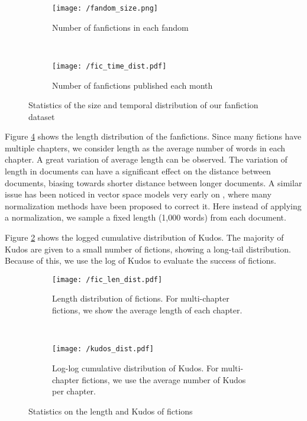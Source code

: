 \documentclass[a4paper]{article}
\begin{document}
\begin{figure}
    \centering
    \begin{subfigure}[b]{0.4\textwidth}
        \texttt{[image: /fandom\_size.png]}
        \caption{Number of fanfictions in each fandom}
        \label{fig:fandom_size}
    \end{subfigure}
    ~ %
    \begin{subfigure}[b]{0.4\textwidth}
        \texttt{[image: /fic\_time\_dist.pdf]}
        \caption{Number of fanfictions published each month}
        \label{fig:fic_time_dist}
    \end{subfigure}
    \caption{Statistics of the size and temporal distribution of our fanfiction dataset}\label{fig:stats_size_time}
\end{figure}

Figure \ref{fig:length_dist} shows the length distribution of the fanfictions. Since many fictions have multiple chapters, we consider length as the average number of words in each chapter. A great variation of average length can be observed. The variation of length in documents can have a significant effect on the distance between documents, biasing towards shorter distance between longer documents. A similar issue has been noticed in vector space models very early on \cite{singhal2017pivoted}, where many normalization methods have been proposed to correct it. Here instead of applying a normalization, we sample a fixed length (1,000 words) from each document. 

Figure \ref{fig:fic_time_dist} shows the logged cumulative distribution of Kudos. The majority of Kudos are given to a small number of fictions, showing a long-tail distribution. Because of this, we use the log of Kudos to evaluate the success of fictions.

\begin{figure}
    \centering
    \begin{subfigure}[b]{0.4\textwidth}
        \texttt{[image: /fic\_len\_dist.pdf]}
        \caption{Length distribution of fictions. For multi-chapter fictions, we show the average length of each chapter.}
        \label{fig:length_dist}
    \end{subfigure}
    ~ %
    \begin{subfigure}[b]{0.4\textwidth}
        \texttt{[image: /kudos\_dist.pdf]}
        \caption{Log-log cumulative distribution of Kudos. For multi-chapter fictions, we use the average number of Kudos per chapter.}
        \label{fig:kudos_dist}
    \end{subfigure}
    \caption{Statistics on the length and Kudos of fictions}\label{fig:stats_len_kudos}
\end{figure}
\end{document}
